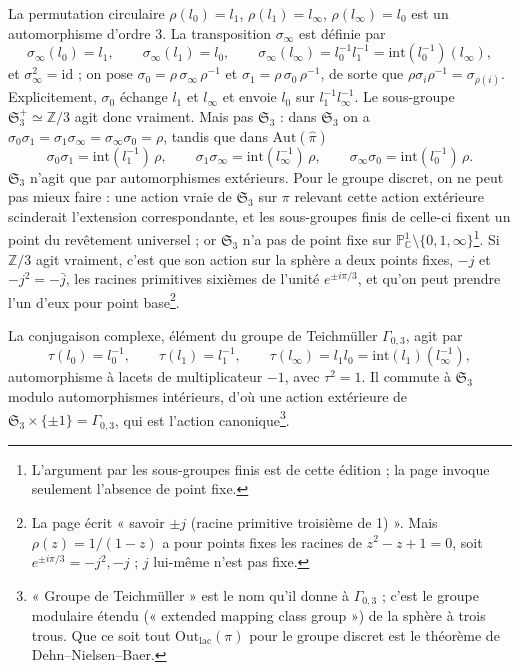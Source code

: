 \documentclass[11pt,a4paper]{article}
\begin{document}
La permutation circulaire $\rho(l_0) = l_1$, $\rho(l_1) = l_\infty$,
$\rho(l_\infty) = l_0$ est un automorphisme d'ordre $3$. La transposition
$\sigma_\infty$ est définie par
\[
\sigma_\infty(l_0) = l_1, \qquad \sigma_\infty(l_1) = l_0, \qquad
\sigma_\infty(l_\infty) = l_0^{-1} l_1^{-1} = \mathrm{int}(l_0^{-1})(l_\infty),
\]
et $\sigma_\infty^2 = \mathrm{id}$ ; on pose $\sigma_0 = \rho\,\sigma_\infty\,
\rho^{-1}$ et $\sigma_1 = \rho\,\sigma_0\,\rho^{-1}$, de sorte que $\rho
\sigma_i \rho^{-1} = \sigma_{\rho(i)}$. Explicitement, $\sigma_0$ échange $l_1$
et $l_\infty$ et envoie $l_0$ sur $l_1^{-1} l_\infty^{-1}$. Le sous-groupe
$\mathfrak{S}_3^{+} \simeq \mathbb{Z}/3$ agit donc vraiment. Mais pas
$\mathfrak{S}_3$ : dans $\mathfrak{S}_3$ on a $\sigma_0\sigma_1 =
\sigma_1\sigma_\infty = \sigma_\infty\sigma_0 = \rho$, tandis que dans
$\mathrm{Aut}(\widehat{\pi})$
\[
\sigma_0\sigma_1 = \mathrm{int}(l_1^{-1})\,\rho, \qquad
\sigma_1\sigma_\infty = \mathrm{int}(l_\infty^{-1})\,\rho, \qquad
\sigma_\infty\sigma_0 = \mathrm{int}(l_0^{-1})\,\rho .
\]
$\mathfrak{S}_3$ n'agit que par automorphismes extérieurs. Pour le groupe
discret, on ne peut pas mieux faire : une action vraie de $\mathfrak{S}_3$ sur
$\pi$ relevant cette action extérieure scinderait l'extension correspondante,
et les sous-groupes finis de celle-ci fixent un point du revêtement universel ;
or $\mathfrak{S}_3$ n'a pas de point fixe sur $\mathbb{P}^1_{\mathbb{C}}
\setminus \{0, 1, \infty\}$\footnote{L'argument par les sous-groupes finis est
de cette édition ; la page invoque seulement l'absence de point fixe.}. Si
$\mathbb{Z}/3$ agit vraiment, c'est que son action sur la sphère a deux points
fixes, $-j$ et $-j^2 = -\bar j$, les racines primitives sixièmes de
l'unité $e^{\pm i\pi/3}$, et qu'on peut prendre l'un d'eux pour point
base\footnote{La page écrit « savoir $\pm j$ (racine primitive troisième de
1) ». Mais $\rho(z) = 1/(1-z)$ a pour points fixes les racines de $z^2 - z + 1
= 0$, soit $e^{\pm i\pi/3} = -j^2, -j$ ; $j$ lui-même n'est pas fixe.}.

La conjugaison complexe, élément du groupe de Teichmüller $\Gamma_{0,3}$,
agit par
\[
\tau(l_0) = l_0^{-1}, \qquad \tau(l_1) = l_1^{-1}, \qquad \tau(l_\infty) =
l_1 l_0 = \mathrm{int}(l_1)(l_\infty^{-1}),
\]
automorphisme à lacets de multiplicateur $-1$, avec $\tau^2 = 1$. Il commute à
$\mathfrak{S}_3$ modulo automorphismes intérieurs, d'où une action extérieure
de $\mathfrak{S}_3 \times \{\pm 1\} = \Gamma_{0,3}$, qui est l'action
canonique\footnote{« Groupe de Teichmüller » est le nom qu'il donne à
$\Gamma_{0,3}$ ; c'est le groupe modulaire étendu (« extended mapping class
group ») de la sphère à trois trous. Que ce soit tout
$\mathrm{Out}_{\mathrm{lac}}(\pi)$ pour le groupe discret est le théorème de
Dehn--Nielsen--Baer.}.
\end{document}
